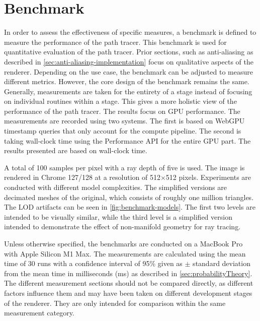 \section{Benchmark}
\label{sec:benchmark}

In order to assess the effectiveness of specific measures, a benchmark is defined to measure the performance of the path tracer. This benchmark is used for quantitative evaluation of the path tracer. Prior sections, such as anti-aliasing as described in \autoref{sec:anti-aliasing-implementation} focus on qualitative aspects of the renderer. Depending on the use case, the benchmark can be adjusted to measure different metrics. However, the core design of the benchmark remains the same. Generally, measurements are taken for the entirety of a stage instead of focusing on individual routines within a stage. This gives a more holistic view of the performance of the path tracer. The results focus on \gls{GPU} performance. The measurements are recorded using two systems. The first is based on \gls{WebGPU} timestamp queries that only account for the compute pipeline. The second is taking wall-clock time using the Performance \gls{API} for the entire \gls{GPU} part. The results presented are based on wall-clock time.

A total of 100 samples per pixel with a ray depth of five is used. The image is rendered in Chrome 127/128 at a resolution of 512$\times$512 pixels. Experiments are conducted with different model complexities. The simplified versions are decimated meshes of the original, which consists of roughly one million triangles. The \gls{LOD} artifacts can be seen in \autoref{fig:benchmark-models}. The first two levels are intended to be visually similar, while the third level is a simplified version intended to demonstrate the effect of non-manifold geometry for ray tracing.

Unless otherwise specified, the benchmarks are conducted on a MacBook Pro with Apple Silicon M1 Max. The measurements are calculated using the mean time of 30 runs with a confidence interval of 95\% given as $\pm$ standard deviation from the mean time in milliseconds (ms) as described in \autoref{sec:probabilityTheory}. The different measurement sections should not be compared directly, as different factors influence them and may have been taken on different development stages of the renderer. They are only intended for comparison within the same measurement category.

